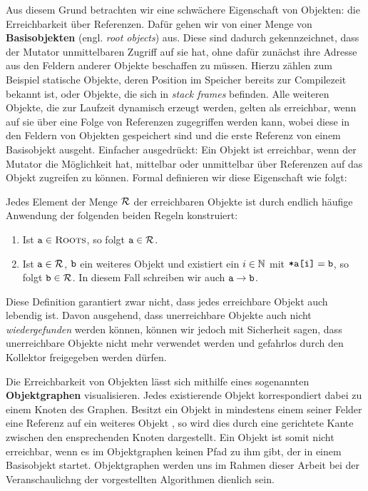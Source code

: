 Aus diesem Grund betrachten wir eine schwächere Eigenschaft von Objekten: die Erreichbarkeit über Referenzen.
Dafür gehen wir von einer Menge \Roots von \textbf{Basisobjekten} (engl. \textit{root objects}) aus.
Diese sind dadurch gekennzeichnet, dass der Mutator unmittelbaren Zugriff auf sie hat, ohne dafür zunächst ihre Adresse aus den Feldern anderer Objekte beschaffen zu müssen.
Hierzu zählen zum Beispiel statische Objekte, deren Position im Speicher bereits zur Compilezeit bekannt ist, oder Objekte, die sich in \textit{stack frames} befinden.
Alle weiteren Objekte, die zur Laufzeit dynamisch erzeugt werden, gelten als erreichbar, wenn auf sie über eine Folge von Referenzen zugegriffen werden kann, wobei diese in den Feldern von Objekten gespeichert sind und die erste Referenz von einem Basisobjekt ausgeht.
Einfacher ausgedrückt: Ein Objekt ist erreichbar, wenn der Mutator die Möglichkeit hat, mittelbar oder unmittelbar über Referenzen auf das Objekt zugreifen zu können.
Formal definieren wir diese Eigenschaft wie folgt:

\begin{mybox}
\begin{defn}[Erreichbarkeit]
	\label{def:erreichbar}
	Jedes Element der Menge $\mathcal{R}$ der erreichbaren Objekte ist durch endlich häufige Anwendung der folgenden beiden Regeln konstruiert:
	\begin{enumerate}[(1)]
		\item Ist $\texttt{a} \in \textsc{Roots}$, so folgt $\texttt{a} \in \mathcal{R}$.
		\item Ist $\texttt{a} \in \mathcal{R}$, $\texttt{b}$ ein weiteres Objekt und existiert ein $i \in \mathbb{N}$ mit $\texttt{*a[i]} = \texttt{b}$, so folgt $\texttt{b} \in \mathcal{R}$.
		In diesem Fall schreiben wir auch $\texttt{a} \rightarrow \texttt{b}$.
	\end{enumerate}
\end{defn}
\end{mybox}

Diese Definition garantiert zwar nicht, dass jedes erreichbare Objekt auch lebendig ist.
Davon ausgehend, dass unerreichbare Objekte auch nicht \textit{wiedergefunden} werden können, können wir jedoch mit Sicherheit sagen, dass unerreichbare Objekte nicht mehr verwendet werden und gefahrlos durch den Kollektor freigegeben werden dürfen.

Die Erreichbarkeit von Objekten lässt sich mithilfe eines sogenannten \textbf{Objektgraphen} visualisieren.
Jedes existierende Objekt korrespondiert dabei zu einem Knoten des Graphen.
Besitzt ein Objekt  in mindestens einem seiner Felder eine Referenz auf ein weiteres Objekt , so wird dies durch eine gerichtete Kante zwischen den ensprechenden Knoten dargestellt.
Ein Objekt ist somit nicht erreichbar, wenn es im Objektgraphen keinen Pfad zu ihm gibt, der in einem Basisobjekt startet.
Objektgraphen werden uns im Rahmen dieser Arbeit bei der Veranschaulichng der vorgestellten Algorithmen dienlich sein.

